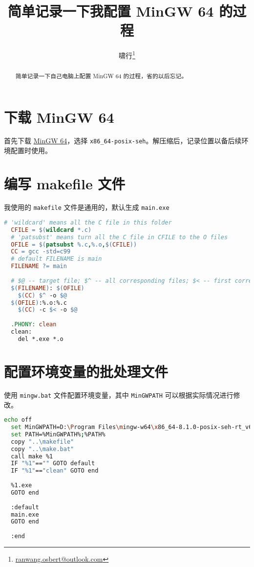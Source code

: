 \documentclass{ctexart}
\title{简单记录一下我配置 MinGW 64 的过程}
\author{啸行\thanks{\url{ranwang.osbert@outlook.com}}}
\begin{document}
  
\maketitle

\begin{abstract}
  简单记录一下自己电脑上配置 MinGW 64 的过程，省的以后忘记。
\end{abstract}

\section{下载 MinGW 64}

首先下载 \href{https://sourceforge.net/projects/mingw-w64/files/mingw-w64/}{MinGW 64}，选择 \texttt{x86\_64-posix-seh}。解压缩后，记录位置以备后续环境配置时使用。

\section{编写 makefile 文件}

我使用的 \texttt{makefile} 文件是通用的，默认生成 \texttt{main.exe}

\begin{lstlisting}[language=make]
  # 'wildcard' means all the C file in this folder
  CFILE = $(wildcard *.c)
  # 'patsubst' means turn all the C file in CFILE to the O files
  OFILE = $(patsubst %.c,%.o,$(CFILE))
  CC = gcc -std=c99
  # default FILENAME is main
  FILENAME ?= main
  
  # $@ -- target file; $^ -- all corresponding files; $< -- first corresponding files
  $(FILENAME): $(OFILE)
  	$(CC) $^ -o $@
  $(OFILE):%.o:%.c
  	$(CC) -c $< -o $@
   
  .PHONY: clean
  clean:
  	del *.exe *.o
\end{lstlisting}

\section{配置环境变量的批处理文件}

使用 \texttt{mingw.bat} 文件配置环境变量，其中 \texttt{MinGWPATH} 可以根据实际情况进行修改。

\begin{lstlisting}[language = bash]
  echo off
  set MinGWPATH=D:\Program Files\mingw-w64\x86_64-8.1.0-posix-seh-rt_v6-rev0\mingw64\bin
  set PATH=%MinGWPATH%;%PATH%
  copy "..\makefile"
  copy "..\make.bat"
  call make %1
  IF "%1"=="" GOTO default
  IF "%1"=="clean" GOTO end
  
  %1.exe
  GOTO end
  
  :default
  main.exe
  GOTO end
  
  :end
\end{lstlisting}
\end{document}
